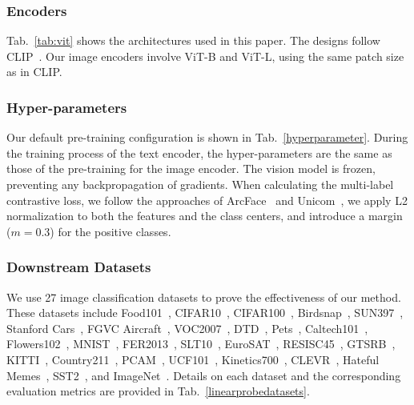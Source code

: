 \subsubsection{Encoders}
Tab.~\ref{tab:vit} shows the architectures used in this paper. The designs follow CLIP~\cite{radford2021learning}. Our image encoders involve \mbox{ViT-B} and \mbox{ViT-L}, using the same patch size as in CLIP.

\subsubsection{Hyper-parameters}
Our default pre-training configuration is shown in Tab.~\ref{hyperparameter}. During the training process of the text encoder, the hyper-parameters are the same as those of the pre-training for the image encoder. The vision model is frozen, preventing any backpropagation of gradients. When calculating the multi-label contrastive loss, we follow the approaches of ArcFace~\cite{deng2019arcface} and Unicom~\cite{an2023unicom}, we apply L2 normalization to both the features and the class centers, and introduce a margin ($m=0.3$) for the positive classes.

\subsubsection{Downstream Datasets}  
We use 27 image classification datasets to prove the effectiveness of our method. These datasets
include Food101~\cite{bossard2014food}, CIFAR10~\cite{krizhevsky2009learning}, CIFAR100~\cite{krizhevsky2009learning}, 
Birdsnap~\cite{berg2014birdsnap},
SUN397~\cite{xiao2010sun},
Stanford Cars~\cite{KrauseStarkDengFei-Fei_3DRR2013},
FGVC Aircraft~\cite{maji2013fine},
VOC2007~\cite{everingham2007pascal},
DTD~\cite{cimpoi2014describing},
Pets~\cite{parkhi2012cats}, 
Caltech101~\cite{fei2004learning},
Flowers102~\cite{nilsback2008automated},
MNIST~\cite{lecun1998gradient},
FER2013~\cite{Goodfellow2013ChallengesIR},
SLT10~\cite{coates2011analysis},
EuroSAT~\cite{helber2019eurosat},
RESISC45~\cite{cheng2017remote},
GTSRB~\cite{stallkamp2012man},
KITTI~\cite{geiger2012we},
Country211~\cite{radford2021learning},
PCAM~\cite{veeling2018rotation},
UCF101~\cite{soomro2012ucf101},
Kinetics700~\cite{carreira2019short},
CLEVR~\cite{johnson2017clevr},
Hateful Memes~\cite{kiela2020hateful},
SST2~\cite{radford2021learning}, and
ImageNet~\cite{deng2009imagenet}. Details on each dataset and the corresponding evaluation metrics are provided in Tab.~\ref{linearprobedatasets}.

